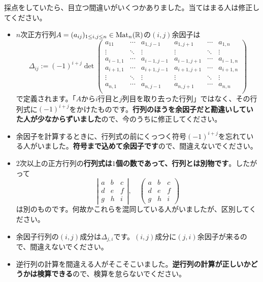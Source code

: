 採点をしていたら、目立つ間違いがいくつかありました。当てはまる人は修正してください。
\begin{itemize}
\item $n$次正方行列$A = (a_{ij})_{1 \leq i, j \leq n} \in \operatorname{Mat}_n(\mathbb{R})$の$(i, j)$余因子は
\[
\Delta_{ij} := (-1)^{i + j} \det
\begin{pmatrix}
a_{11} & \cdots & a_{1, j-1} & a_{1, j + 1} & \cdots & a_{1, n} \\
\vdots & \ddots & \vdots & \vdots & \ddots & \vdots \\
a_{i - 1, 1} & \cdots & a_{i - 1, j-1} & a_{i - 1, j + 1} & \cdots & a_{i - 1, n} \\
a_{i + 1, 1} & \cdots & a_{i + 1, j-1} & a_{i + 1, j + 1} & \cdots & a_{i + 1, n} \\
\vdots & \ddots & \vdots & \vdots & \ddots & \vdots \\
a_{n, 1} & \cdots & a_{n, j-1} & a_{n, j + 1} & \cdots & a_{n, n} \\
\end{pmatrix}
\]
で定義されます。「$A$から$i$行目と$j$列目を取り去った行列」ではなく、その行列式に$(-1)^{i + j}$をかけたものです。\textbf{行列のほうを余因子だと勘違いしていた人が少なからずいました}ので、今のうちに修正してください。
\item 余因子を計算するときに、行列式の前にくっつく符号$(-1)^{i + j}$を忘れている人がいました。\textbf{符号まで込めて余因子です}ので、間違えないでください。
\item $2$次以上の正方行列の\textbf{行列式は$1$個の数であって、行列とは別物です}。したがって
\[
\left|
\begin{array}{ccc}
a & b & c \\
d & e & f \\
g & h & i
\end{array}
\right|, \quad
\left(
\begin{array}{ccc}
a & b & c \\
d & e & f \\
g & h & i
\end{array}
\right)
\]
は別のものです。何故かこれらを混同している人がいましたが、区別してください。
\item 余因子行列の$(i, j)$成分は$\Delta_{j, i}$です。$(i, j)$成分に$(j, i)$余因子が来るので、間違えないでください。
\item 逆行列の計算を間違える人がそこそこいました。\textbf{逆行列の計算が正しいかどうかは検算できる}ので、検算を怠らないでください。
\end{itemize}

